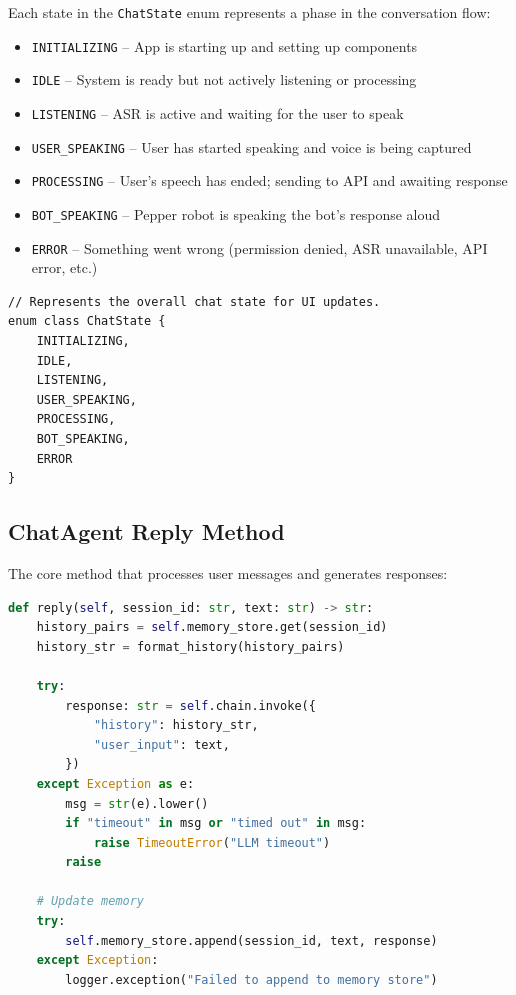 \documentclass[a4paper]{article}
\begin{document}
\begin{appendices}
Each state in the \texttt{ChatState} enum represents a phase in the conversation flow:
\begin{itemize}[noitemsep]
    \item \texttt{INITIALIZING} – App is starting up and setting up components
    \item \texttt{IDLE} – System is ready but not actively listening or processing
    \item \texttt{LISTENING} – ASR is active and waiting for the user to speak
    \item \texttt{USER\_SPEAKING} – User has started speaking and voice is being captured
    \item \texttt{PROCESSING} – User's speech has ended; sending to API and awaiting response
    \item \texttt{BOT\_SPEAKING} – Pepper robot is speaking the bot's response aloud
    \item \texttt{ERROR} – Something went wrong (permission denied, ASR unavailable, API error, etc.)
\end{itemize}
\begin{lstlisting}[style=kotlinstyle, caption={enum ChatState from MainActivity.kt}, label=lst:ui-states]
// Represents the overall chat state for UI updates.
enum class ChatState {
    INITIALIZING,
    IDLE,
    LISTENING,
    USER_SPEAKING,
    PROCESSING,
    BOT_SPEAKING,
    ERROR
}
\end{lstlisting}

\subsection{ChatAgent Reply Method}
\label{app:reply}
The core method that processes user messages and generates responses:

\begin{lstlisting}[language=Python, caption={ChatAgent.reply() method from chain.py}]
def reply(self, session_id: str, text: str) -> str:
    history_pairs = self.memory_store.get(session_id)
    history_str = format_history(history_pairs)

    try:
        response: str = self.chain.invoke({
            "history": history_str,
            "user_input": text,
        })
    except Exception as e:
        msg = str(e).lower()
        if "timeout" in msg or "timed out" in msg:
            raise TimeoutError("LLM timeout")
        raise

    # Update memory
    try:
        self.memory_store.append(session_id, text, response)
    except Exception:
        logger.exception("Failed to append to memory store")


\end{lstlisting}
\end{appendices}
\end{document}
